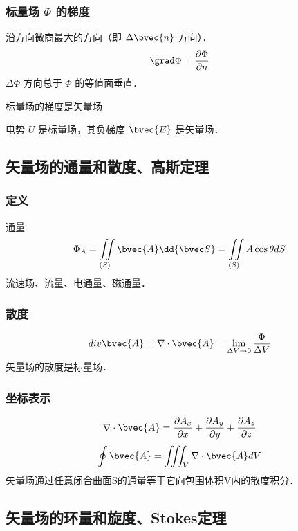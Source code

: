 \subsubsection{标量场 $\Phi$ 的梯度}
沿方向微商最大的方向（即 $\Delta \bvec{n}$ 方向）．
\begin{equation}\label{VecAnl_eq5}
\grad \Phi = \frac{\partial \Phi}{\partial n}
\end{equation}
$\Delta \Phi$ 方向总于 $\Phi$ 的等值面垂直．

标量场的梯度是矢量场

电势 $U$ 是标量场，其负梯度 $\bvec{E}$ 是矢量场．

\subsection{矢量场的通量和散度、高斯定理}%
\subsubsection{定义}
通量
\begin{equation}\label{VecAnl_eq6}
\Phi_A=\iint\limits_{(S)} \bvec{A} \dd{\bvec S} = \iint\limits_{(S)} A\cos\theta dS
\end{equation}
流速场、流量、电通量、磁通量．

\subsubsection{散度}
\begin{equation}\label{VecAnl_eq7}
div \bvec{A}=\nabla \cdot \bvec{A}=\lim_{\Delta V \to 0}\frac{\Phi}{\Delta V}
\end{equation}
矢量场的散度是标量场．

\subsubsection{坐标表示}
\begin{equation}\label{VecAnl_eq8}
\nabla \cdot \bvec{A}= \frac{\partial A_x}{\partial x}+\frac{\partial A_y}{\partial y}+\frac{\partial A_z}{\partial z}
\end{equation}
\begin{equation}\label{VecAnl_eq9}
\oint \bvec{A}=\iiint_V \nabla \cdot \bvec{A} dV
\end{equation}
矢量场通过任意闭合曲面S的通量等于它向包围体积V内的散度积分．
\subsection{矢量场的环量和旋度、Stokes定理}%

